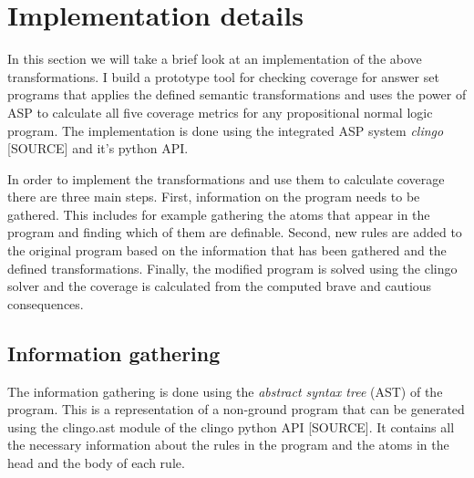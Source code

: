\begin{comment}
- use the $\_ri$ labels from rule coverage, no new labels needed!

- a subprogram $P' \subseteq P$ is covered if exactly all rules contained in $P'$ are covered and no other rules are covered

- two ways to go about computing it!

-> each answer set covers exactly one subprogram -> it is necessary to look at every answer set instead of just brave/cautious like 
with the other coverage metrics -> has to be computed seperately from the other coverage metrics!

- for $P = \{r_1,...,r_n\}$,  $\{\_rx,...,\_ry\}$ are the rule labels in an answer set <=> $P'=\{r_x,...,r_y\}$ is covered
\end{comment}

\section{Implementation details}
\label{sec:Computing coverage metrics for propositional programs/Implementation details}
In this section we will take a brief look at an implementation of the above transformations. I build a prototype tool for checking coverage for answer set programs that applies the defined semantic transformations and uses the power of ASP to calculate all five coverage metrics for any propositional normal logic program. The implementation is done using the integrated ASP system \emph{clingo} [SOURCE] and it's python API. 

In order to implement the transformations and use them to calculate coverage there are three main steps. First, information on the program needs to be gathered. This includes for example gathering the atoms that appear in the program and finding which of them are definable. Second, new rules are added to the original program based on the information that has been gathered and the defined transformations. Finally, the modified program is solved using the clingo solver and the coverage is calculated from the computed brave and cautious consequences.

\subsection{Information gathering}
\label{subsec:Computing coverage metrics for propositional programs/Implementation details/Information gathering}
The information gathering is done using the \emph{abstract syntax tree} (AST) of the program. This is a representation of a non-ground program that can be generated using the clingo.ast module of the clingo python API [SOURCE]. It contains all the necessary information about the rules in the program and the atoms in the head and the body of each rule. 

